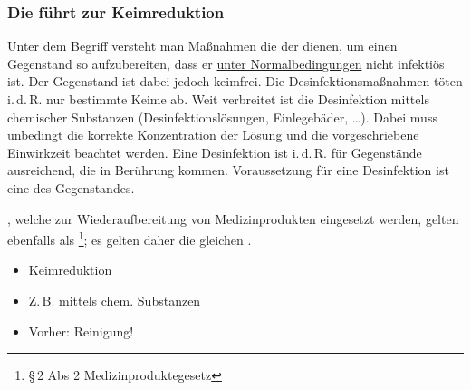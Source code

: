 \subsubsection{Die  führt zur Keimreduktion}
\label{topic:desinfektion-grundzuege}

{%
Unter dem Begriff  versteht man Maßnahmen
die der  dienen, um einen Gegenstand so
aufzubereiten, dass er \underline{unter Normalbedingungen}
nicht infektiös ist. Der Gegenstand ist dabei jedoch
 keimfrei. Die Desinfektionsmaßnahmen töten
i.\,d.\,R. nur bestimmte Keime ab. Weit verbreitet ist die
Desinfektion mittels chemischer Substanzen
(Desinfektionslösungen, Einlegebäder, \ldots). Dabei muss
unbedingt die korrekte Konzentration der Lösung und die
vorgeschriebene Einwirkzeit beachtet werden.
Eine Desinfektion ist i.\,d.\,R. für Gegenstände
ausreichend, die  in Berührung
kommen.
Voraussetzung für eine Desinfektion ist eine
 des Gegenstandes.

, welche zur
Wiederaufbereitung von Medizinprodukten eingesetzt werden,
gelten ebenfalls als \footnote{{\S}\,2 Abs
2 Medizinproduktegesetz}; es gelten daher die gleichen
.
}{
\begin{itemize}
  \item Keimreduktion
  \item Z.\,B. mittels chem. Substanzen
  \item Vorher: Reinigung!
\end{itemize}
}{}{}{}

\begin{Synopsis}
\end{Synopsis}

\clearpage%

